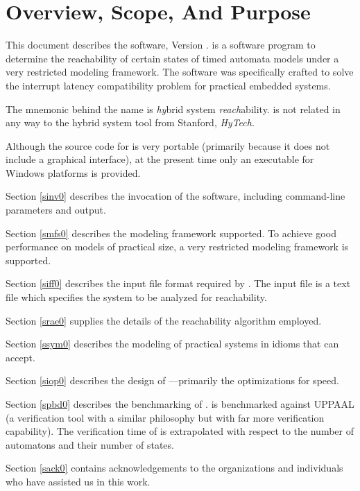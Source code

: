 %
\section{Overview, Scope, And Purpose}
\label{sosp0}

This document describes the \swname{} software, Version \swversion{}.  
\swname{} is a software 
program to determine the reachability of certain states of timed automata models 
under a very restricted modeling framework.  The software was specifically crafted 
to solve the interrupt latency compatibility problem for practical embedded systems.

The mnemonic behind the name \swname{} is \emph{hy}brid system 
\emph{reach}ability.  \swname{} is not 
related in any way to the hybrid system tool from Stanford, \emph{HyTech}.

Although the source code for \swname{} is very portable (primarily because it does 
not include a graphical interface), at the present time only an executable for Windows 
platforms is provided.

Section \ref{sinv0} describes the invocation of the software, 
including command-line parameters 
and output.

Section \ref{smfs0} describes the modeling framework supported. 
To achieve good performance on 
models of practical size, a very restricted modeling framework is supported.

Section \ref{siff0} describes the input file format required by \swname{}.  
The input file is a 
text file which specifies the system to be analyzed for reachability.

Section \ref{srae0} supplies the details of the reachability algorithm employed.

Section \ref{ssym0} describes the modeling of practical systems in idioms 
that \swname{} can accept.

Section \ref{siop0} describes the design of \swname{}---primarily 
the optimizations for speed.

Section \ref{spbd0} describes the benchmarking of \swname{}.  \swname{} is benchmarked 
against UPPAAL (a verification tool with a similar philosophy but with far more 
verification capability).  The verification time of \swname{} is extrapolated with 
respect to the number of automatons and their number of states.

Section \ref{sack0} contains acknowledgements to the organizations and individuals
who have assisted us in this work.

